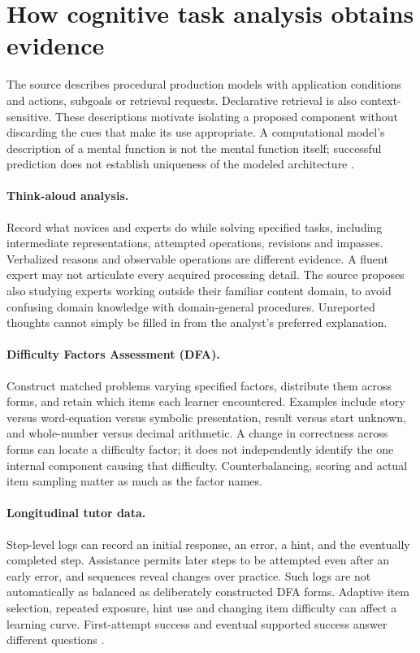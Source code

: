 \section{How cognitive task analysis obtains evidence}
\label{sec:p19-cta-methods}

The source describes procedural production models with application
conditions and actions, subgoals or retrieval requests. Declarative
retrieval is also context-sensitive. These descriptions motivate
isolating a proposed component without discarding the cues that make
its use appropriate. A computational model's description of a mental
function is not the mental function itself; successful prediction does
not establish uniqueness of the modeled architecture
\cite[galley pp.~703--704,713]{KoedingerRoll2011TransferTypeset}.

\paragraph{Think-aloud analysis.}
Record what novices and experts do while solving specified tasks,
including intermediate representations, attempted operations, revisions
and impasses. Verbalized reasons and observable operations are different
evidence. A fluent expert may not articulate every acquired processing
detail. The source proposes also studying experts working outside their
familiar content domain, to avoid confusing domain knowledge with
domain-general procedures. Unreported thoughts cannot simply be filled
in from the analyst's preferred explanation.

\paragraph{Difficulty Factors Assessment (DFA).}
Construct matched problems varying specified factors, distribute them
across forms, and retain which items each learner encountered. Examples
include story versus word-equation versus symbolic presentation,
result versus start unknown, and whole-number versus decimal arithmetic.
A change in correctness across forms can locate a difficulty factor;
it does not independently identify the one internal component causing
that difficulty. Counterbalancing, scoring and actual item sampling
matter as much as the factor names.

\paragraph{Longitudinal tutor data.}
Step-level logs can record an initial response, an error, a hint, and
the eventually completed step. Assistance permits later steps to be
attempted even after an early error, and sequences reveal changes over
practice. Such logs are not automatically as balanced as deliberately
constructed DFA forms. Adaptive item selection, repeated exposure,
hint use and changing item difficulty can affect a learning curve.
First-attempt success and eventual supported success answer different
questions \cite[galley pp.~708--711]{KoedingerRoll2011TransferTypeset}.

